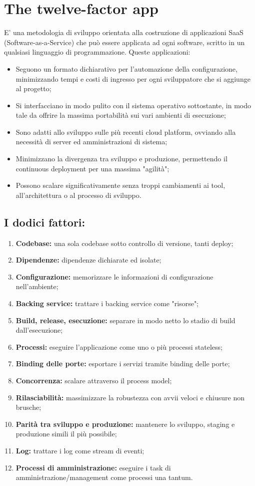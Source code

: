 \documentclass[PianoDiQualifica.tex]{subfiles}
\begin{document}
\chapter{The twelve-factor app}
E' una metodologia di sviluppo orientata alla costruzione di applicazioni SaaS (Software-as-a-Service) che può essere applicata ad ogni software, scritto in un qualsiasi linguaggio di programmazione.
Queste applicazioni:
\begin{itemize}
\item Seguono un formato dichiarativo per l'automazione della configurazione, minimizzando tempi e costi di ingresso per ogni sviluppatore che si aggiunge al progetto;
\item Si interfacciano in modo pulito con il sistema operativo sottostante, in modo tale da offrire la massima portabilità sui vari ambienti di esecuzione;
\item Sono adatti allo sviluppo sulle più recenti cloud platform, ovviando alla necessità di server ed amministrazioni di sistema;
\item Minimizzano la divergenza tra sviluppo e produzione, permettendo il continuous deployment per una massima "agilità";
\item Possono scalare significativamente senza troppi cambiamenti ai tool, all'architettura o al processo di sviluppo.
\end{itemize}

\section{I dodici fattori:}
\begin{enumerate}
\item \textbf{Codebase:} una sola codebase sotto controllo di versione, tanti deploy;
\item \textbf{Dipendenze:} dipendenze dichiarate ed isolate;
\item \textbf{Configurazione:} memorizzare le informazioni di configurazione nell'ambiente;
\item \textbf{Backing service:} trattare i backing service come "risorse";
\item \textbf{Build, release, esecuzione:} separare in modo netto lo stadio di build dall'esecuzione;
\item \textbf{Processi:} eseguire l'applicazione come uno o più processi stateless;
\item \textbf{Binding delle porte:} esportare i servizi tramite binding delle porte;
\item \textbf{Concorrenza:} scalare attraverso il process model;
\item \textbf{Rilasciabilità:} massimizzare la robustezza con avvii veloci e chiusure non brusche;
\item \textbf{Parità tra sviluppo e produzione:} mantenere lo sviluppo, staging e produzione simili il più possibile;
\item \textbf{Log:} trattare i log come stream di eventi;
\item \textbf{Processi di amministrazione:} eseguire i task di amministrazione/management come processi una tantum.
\end{enumerate}
\end{document}
